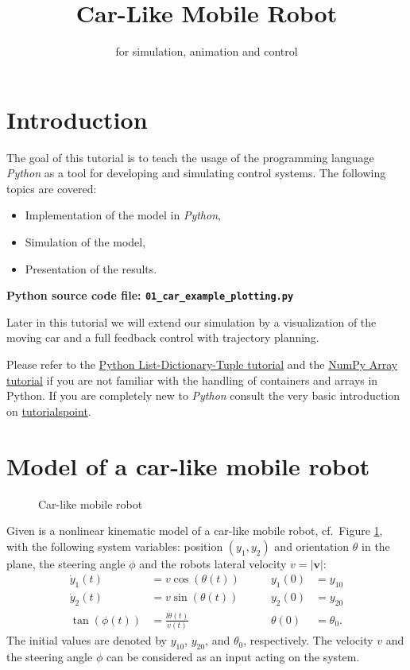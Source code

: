 \documentclass[a4paper,11pt,headings=standardclasses,parskip=half]{scrartcl}
\title{Car-Like Mobile Robot}
\subtitle{\py for simulation, animation and control}%
\author{}
\date{}
\newcommand{\py}{\emph{Python}\xspace}
\begin{document}
\maketitle%

\tableofcontents

\newpage

\section{Introduction}
The goal of this tutorial is to teach the usage of the programming language \py as a tool for developing and simulating control systems. The following topics are covered:
\begin{itemize}
\item Implementation of the model in \py,
\item Simulation of the model,
\item Presentation of the results.
\end{itemize}
\textbf{Python source code file: \texttt{01\_car\_example\_plotting.py}}

Later in this tutorial we will extend our simulation by a visualization of the moving car and a full feedback control with trajectory planning.

Please refer to the \href{http://cs231n.github.io/python-numpy-tutorial/#python-containers}{Python List-Dictionary-Tuple tutorial} and the \href{http://cs231n.github.io/python-numpy-tutorial/#numpy}{NumPy Array tutorial} if you are not familiar with the handling of containers and arrays in Python. If you are completely new to \py consult the very basic introduction on \href{https://www.tutorialspoint.com/python/index.htm}{tutorialspoint}.

\section{Model of a car-like mobile robot}
\label{sec:model}
\begin{figure}[ht]
	\centering
	\def\svgwidth{0.7\textwidth}
	
	\caption{Car-like mobile robot}
	\label{fig:car}
\end{figure}
Given is a nonlinear kinematic model of a car-like mobile robot, cf.~Figure \ref{fig:car}, with the following system variables: position $(y_1, y_2)$ and orientation $\theta$ in the plane, the steering angle $\phi$ and the robots lateral velocity $v=\left| \mathbf{v} \right| $: 
\begin{subequations}\label{eq:syseq}
\begin{alignat}{2}
\dot{y}_1(t)&=v \cos (\theta(t)) &\qquad y_1(0) &= y_{10}\\
\dot{y}_2(t)&=v \sin (\theta(t)) &\qquad y_2(0) &= y_{20}\\
\tan(\phi(t)) &= \frac{l\dot{\theta}(t)}{v(t)} &\qquad \theta(0) &= \theta_{0}.
\end{alignat}
\end{subequations}
The initial values are denoted by $y_{10}$, $y_{20}$, and $\theta_0$, respectively. The velocity $v$ and the steering angle $\phi$ can be considered as an input acting on the system.
\end{document}
